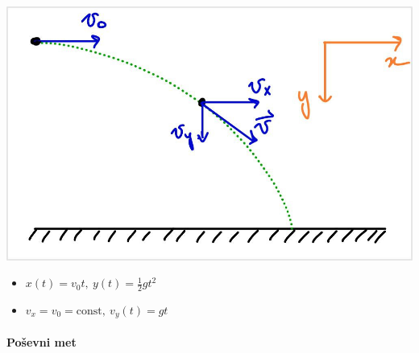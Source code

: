 \begin{minipage}[t]{0.35\textwidth}
    \vspace{0pt}
  \includegraphics[width=\linewidth]{img/01_001.jpg} 
\end{minipage}
\hfill
\begin{minipage}[t]{0.60\textwidth}
    \vspace{0pt}
    \begin{itemize}
        \item \(x(t) = v_0 t, \ y(t) = \frac{1}{2}gt^2\)
        \item \(v_x = v_0 = \text{const}, \ v_y(t) = gt\)
    \end{itemize}
\end{minipage}
%
\paragraph{Poševni met}
\ 

